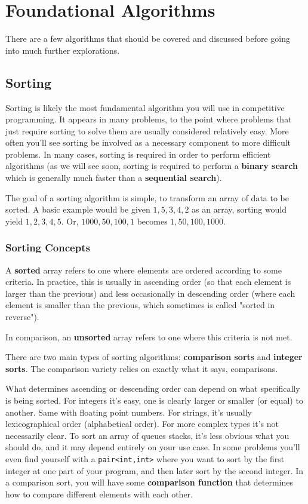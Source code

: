 \section{Foundational Algorithms}

There are a few algorithms that should be covered and discussed before going into much further explorations.

\subsection{Sorting}

Sorting is likely the most fundamental algorithm you will use in competitive programming. It appears in many problems, to the point where problems that just require sorting to solve them are usually considered relatively easy. More often you'll see sorting be involved as a necessary component to more difficult problems. In many cases, sorting is required in order to perform efficient algorithms (as we will see soon, sorting is required to perform a \textbf{binary search} which is generally much faster than a \textbf{sequential search}).

The goal of a sorting algorithm is simple, to transform an array of data to be sorted. A basic example would be given $1,5,3,4,2$ as an array, sorting would yield $1,2,3,4,5$. Or, $1000,50,100,1$ becomes $1,50,100,1000$.

\subsubsection{Sorting Concepts}

A \textbf{sorted} array refers to one where elements are ordered according to some criteria. In practice, this is usually in ascending order (so that each element is larger than the previous) and less occasionally in descending order (where each element is smaller than the previous, which sometimes is called "sorted in reverse").

In comparison, an \textbf{unsorted} array refers to one where this criteria is not met.

There are two main types of sorting algorithms: \textbf{comparison sorts} and \textbf{integer sorts}. The comparison variety relies on exactly what it says, comparisons.

What determines ascending or descending order can depend on what specifically is being sorted. For integers it's easy, one is clearly larger or smaller (or equal) to another. Same with floating point numbers. For strings, it's usually lexicographical order (alphabetical order). For more complex types it's not necessarily clear. To sort an array of queues stacks, it's less obvious what you should do, and it may depend entirely on your use case. In some problems you'll even find yourself with a \texttt{pair<int,int>} where you want to sort by the first integer at one part of your program, and then later sort by the second integer. In a comparison sort, you will have some \textbf{comparison function} that determines how to compare different elements with each other.

